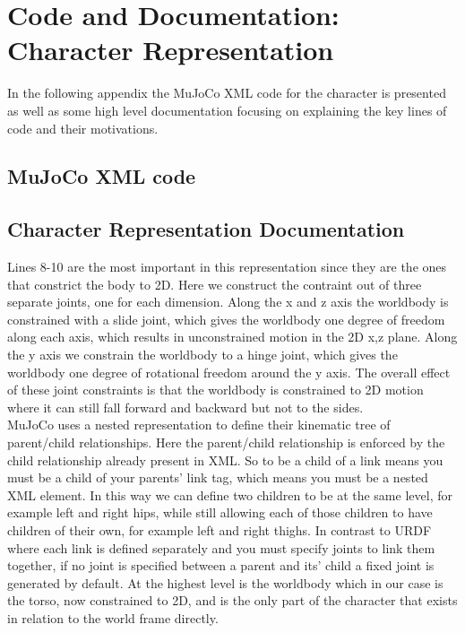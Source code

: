 \documentclass[12pt, a4paper]{article}
\begin{document}
\newpage
{}
\newpage

\appendix
\section{Code and Documentation: Character Representation}
\label{apdx: character}
In the following appendix the MuJoCo XML code for the character is presented as well as some high level documentation focusing on explaining the key lines of code and their motivations. 

\subsection{MuJoCo XML code}
\lstset{breaklines=true,breakatwhitespace = false, basicstyle=\footnotesize, numbers=left}

\subsection{Character Representation Documentation}
Lines 8-10 are the most important in this representation since they are the ones that constrict the body to 2D. Here we construct the contraint out of three separate joints, one for each dimension. Along the x and z axis the worldbody is constrained with a slide joint, which gives the worldbody one degree of freedom along each axis, which results in unconstrained motion in the 2D x,z plane. Along the y axis we constrain the worldbody to a hinge joint, which gives the worldbody one degree of rotational freedom around the y axis. The overall effect of these joint constraints is that the worldbody is constrained to 2D motion where it can still fall forward and backward but not to the sides. \\

MuJoCo uses a nested representation to define their kinematic tree of parent/child relationships. Here the parent/child relationship is enforced by the child relationship already present in XML. So to be a child of a link means you must be a child of your parents' link tag, which means you must be a nested XML element. In this way we can define two children to be at the same level, for example left and right hips, while still allowing each of those children to have children of their own, for example left and right thighs. In contrast to URDF where each link is defined separately and you must specify joints to link them together, if no joint is specified between a parent and its' child a fixed joint is generated by default.  At the highest level is the worldbody which in our case is the torso, now constrained to 2D, and is the only part of the character that exists in relation to the world frame directly.\\
\end{document}
